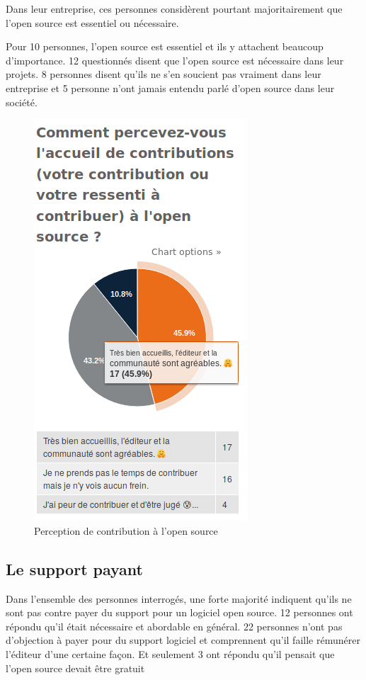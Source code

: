 		Dans leur entreprise, ces personnes considèrent pourtant majoritairement que l'open source est essentiel ou nécessaire.

		Pour 10 personnes, l'open source est essentiel et ils y attachent beaucoup d'importance.
		12 questionnés disent que l'open source est nécessaire dans leur projets. 8 personnes disent qu'ils ne s'en soucient pas vraiment dans leur entreprise et 5 personne n'ont jamais entendu parlé d'open source dans leur société.

		\begin{figure}[h]
			\center
			\includegraphics[scale=0.58]{./img/a7}
			\caption{Perception de contribution à l'open source}					
		\end{figure}

		\newpage

		\subsection{Le support payant}

		Dans l'ensemble des personnes interrogés, une forte majorité indiquent qu'ils ne sont pas contre payer du support pour un logiciel open source. 12 personnes ont répondu qu'il était nécessaire et abordable en général. 22 personnes n'ont pas d'objection à payer pour du support logiciel et comprennent qu'il faille rémunérer l'éditeur d'une certaine façon. Et seulement 3 ont répondu qu'il pensait que l'open source devait être gratuit

